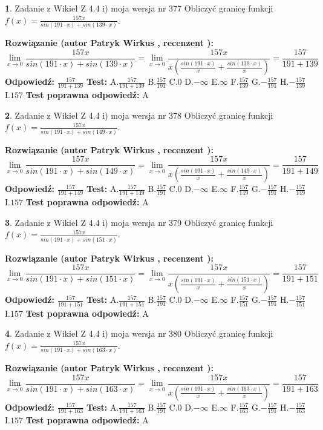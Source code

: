 \documentclass[12pt, a4paper]{article}
\theoremstyle{definition} %
\newtheorem{zad}{}
\newcommand{\zadStart}[1]{\begin{zad}#1\newline}
\newcommand{\zadStop}{\end{zad}}
\newcommand{\rozwStart}[2]{\noindent \textbf{Rozwiązanie (autor #1 , recenzent #2): }\newline}
\newcommand{\rozwStop}{\newline}
\newcommand{\odpStart}{\noindent \textbf{Odpowiedź:}\newline}
\newcommand{\odpStop}{\newline}
\newcommand{\testStart}{\noindent \textbf{Test:}\newline}
\newcommand{\testStop}{\newline}
\newcommand{\kluczStart}{\noindent \textbf{Test poprawna odpowiedź:}\newline}
\newcommand{\kluczStop}{\newline}
\begin{document}
\zadStart{Zadanie z Wikieł Z 4.4 i) moja wersja nr 377}
Obliczyć granicę funkcji $f(x)=\frac{157x}{sin(191\cdot x) +sin(139\cdot x)}$.
\zadStop
\rozwStart{Patryk Wirkus}{}
$$\lim\limits_{x\to 0}\frac{157x}{sin(191\cdot x) +sin(139\cdot x)}=\lim\limits_{x\to 0}\frac{157x}{x(\frac{sin(191\cdot x)}{x}+\frac{sin(139\cdot x)}{x})}=\frac{157}{191+139}$$
\rozwStop
\odpStart
$\frac{157}{191+139}$
\odpStop
\testStart
A.$\frac{157}{191+139}$
B.$\frac{157}{191}$
C.$0$
D.$-\infty$
E.$\infty$
F.$\frac{157}{139}$
G.$-\frac{157}{191}$
H.$-\frac{157}{139}$
I.$157$
\testStop
\kluczStart
A
\kluczStop



\zadStart{Zadanie z Wikieł Z 4.4 i) moja wersja nr 378}
Obliczyć granicę funkcji $f(x)=\frac{157x}{sin(191\cdot x) +sin(149\cdot x)}$.
\zadStop
\rozwStart{Patryk Wirkus}{}
$$\lim\limits_{x\to 0}\frac{157x}{sin(191\cdot x) +sin(149\cdot x)}=\lim\limits_{x\to 0}\frac{157x}{x(\frac{sin(191\cdot x)}{x}+\frac{sin(149\cdot x)}{x})}=\frac{157}{191+149}$$
\rozwStop
\odpStart
$\frac{157}{191+149}$
\odpStop
\testStart
A.$\frac{157}{191+149}$
B.$\frac{157}{191}$
C.$0$
D.$-\infty$
E.$\infty$
F.$\frac{157}{149}$
G.$-\frac{157}{191}$
H.$-\frac{157}{149}$
I.$157$
\testStop
\kluczStart
A
\kluczStop



\zadStart{Zadanie z Wikieł Z 4.4 i) moja wersja nr 379}
Obliczyć granicę funkcji $f(x)=\frac{157x}{sin(191\cdot x) +sin(151\cdot x)}$.
\zadStop
\rozwStart{Patryk Wirkus}{}
$$\lim\limits_{x\to 0}\frac{157x}{sin(191\cdot x) +sin(151\cdot x)}=\lim\limits_{x\to 0}\frac{157x}{x(\frac{sin(191\cdot x)}{x}+\frac{sin(151\cdot x)}{x})}=\frac{157}{191+151}$$
\rozwStop
\odpStart
$\frac{157}{191+151}$
\odpStop
\testStart
A.$\frac{157}{191+151}$
B.$\frac{157}{191}$
C.$0$
D.$-\infty$
E.$\infty$
F.$\frac{157}{151}$
G.$-\frac{157}{191}$
H.$-\frac{157}{151}$
I.$157$
\testStop
\kluczStart
A
\kluczStop



\zadStart{Zadanie z Wikieł Z 4.4 i) moja wersja nr 380}
Obliczyć granicę funkcji $f(x)=\frac{157x}{sin(191\cdot x) +sin(163\cdot x)}$.
\zadStop
\rozwStart{Patryk Wirkus}{}
$$\lim\limits_{x\to 0}\frac{157x}{sin(191\cdot x) +sin(163\cdot x)}=\lim\limits_{x\to 0}\frac{157x}{x(\frac{sin(191\cdot x)}{x}+\frac{sin(163\cdot x)}{x})}=\frac{157}{191+163}$$
\rozwStop
\odpStart
$\frac{157}{191+163}$
\odpStop
\testStart
A.$\frac{157}{191+163}$
B.$\frac{157}{191}$
C.$0$
D.$-\infty$
E.$\infty$
F.$\frac{157}{163}$
G.$-\frac{157}{191}$
H.$-\frac{157}{163}$
I.$157$
\testStop
\kluczStart
A
\kluczStop
\end{document}
